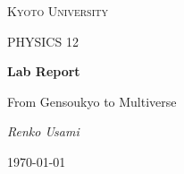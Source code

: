 \documentclass[12pt, letterpaper]{article}
\begin{document}
\begin{titlepage}
\centering
{\scshape\LARGE Kyoto University\par}
\vspace{1cm}
{\scshape\Large PHYSICS 12\par}
\vspace{1.5cm}
{\huge\bfseries Lab Report\par}
\vspace{1cm}
{\Large From Gensoukyo to Multiverse\par}
\vspace{2cm}
{\Large\itshape Renko Usami\par}
\vfill
{\large \today\par}
\end{titlepage}
\end{document}
